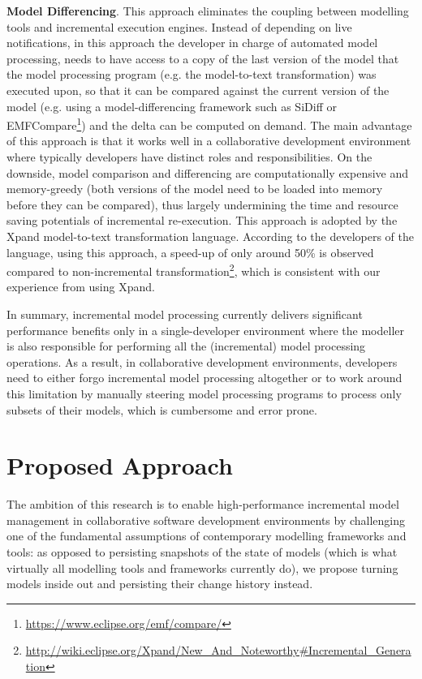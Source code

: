 \documentclass[conference]{IEEEtran}
\begin{document}
\textbf{Model Differencing}. This approach eliminates the coupling between modelling tools and incremental execution engines. Instead of depending on live notifications, in this approach the developer in charge of automated model processing, needs to have access to a copy of the last version of the model that the model processing program (e.g. the model-to-text transformation) was executed upon, so that it can be compared against the current version of the model (e.g. using a model-differencing framework such as SiDiff \cite{kelter2005generic} or EMFCompare\footnote{\url{https://www.eclipse.org/emf/compare/}}) and the delta can be computed on demand. The main advantage of this approach is that it works well in a collaborative development environment where typically developers have distinct roles and responsibilities. On the downside, model comparison and differencing are computationally expensive and memory-greedy (both versions of the model need to be loaded into memory before they can be compared), thus largely undermining the time and resource saving potentials of incremental re-execution. This approach is adopted by the Xpand model-to-text transformation language. According to the developers of the language, using this approach, a speed-up of only around 50\% is observed compared to non-incremental transformation\footnote{\url{http://wiki.eclipse.org/Xpand/New_And_Noteworthy\#Incremental_Generation}}, which is consistent with our experience from using Xpand.

In summary, incremental model processing currently delivers significant performance benefits only in a single-developer environment where the modeller is also responsible for performing all the (incremental) model processing operations. As a result, in collaborative development environments, developers need to either forgo incremental model processing altogether or to work around this limitation by manually steering model processing programs to process only subsets of their models, which is cumbersome and error prone.

\section{Proposed Approach}
\label{sec:proposed_approach}
The ambition of this research is to enable high-performance incremental model management in collaborative software development environments by challenging one of the fundamental assumptions of contemporary modelling frameworks and tools: as opposed to persisting snapshots of the state of models (which is what virtually all modelling tools and frameworks currently do), we propose turning models inside out and persisting their change history instead.
\end{document}
